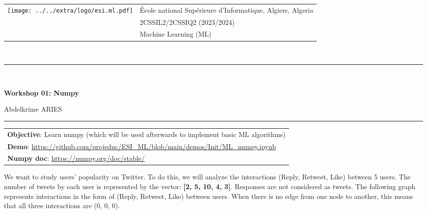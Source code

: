\documentclass[11pt, a4paper]{article}
\begin{document}
\noindent
\begin{tabular}{ll}
\multirow{3}{*}{\texttt{[image: ../../extra/logo/esi.ml.pdf]}} & \'Ecole national Supérieure d'Informatique, Algiers, Algeria\\
& 2CSSIL2/2CSSIQ2 (2023/2024)\\
& Machine Learning (ML)
\end{tabular}\\[.25cm]
\noindent\rule{\textwidth}{1pt}\\[-0.5cm]
\begin{center}
{\LARGE \textbf{Workshop 01: Numpy}}
\begin{flushright}
	Abdelkrime ARIES
\end{flushright}
\end{center}\vspace{-.25cm}
\noindent\rule{\textwidth}{1pt}

\noindent
\begin{tabular}{|p{\textwidth}|}
	\hline
	\textbf{Objective}: Learn numpy (which will be used afterwards to implement basic ML algorithms) \\
	\textbf{Demo}: \url{https://github.com/projeduc/ESI_ML/blob/main/demos/Init/ML_numpy.ipynb} \\
	\textbf{Numpy doc}: \url{https://numpy.org/doc/stable/} \\
	\hline
\end{tabular}

We want to study users' popularity on Twitter.
To do this, we will analyze the interactions (Reply, Retweet, Like) between 5 users.
The number of tweets by each user is represented by the vector: \textbf{[2, 5, 10, 4, 3]}.
Responses are not considered as tweets.
The following graph represents interactions in the form of (Reply, Retweet, Like) between users.
When there is no edge from one node to another, this means that all three interactions are (0, 0, 0).
\end{document}
